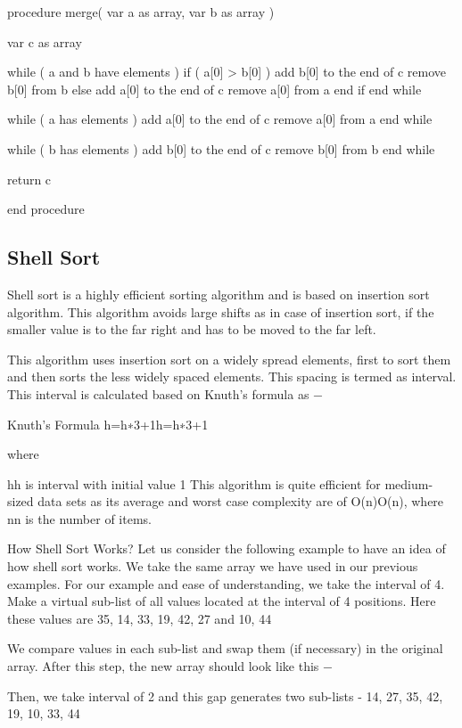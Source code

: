 procedure merge( var a as array, var b as array )

   var c as array

   while ( a and b have elements )
      if ( a[0] > b[0] )
         add b[0] to the end of c
         remove b[0] from b
      else
         add a[0] to the end of c
         remove a[0] from a
      end if
   end while

   while ( a has elements )
      add a[0] to the end of c
      remove a[0] from a
   end while

   while ( b has elements )
      add b[0] to the end of c
      remove b[0] from b
   end while

   return c

end procedure

\subsection{Shell Sort}

Shell sort is a highly efficient sorting algorithm and is based on insertion sort algorithm. This algorithm avoids large shifts as in case of insertion sort, if the smaller value is to the far right and has to be moved to the far left.

This algorithm uses insertion sort on a widely spread elements, first to sort them and then sorts the less widely spaced elements. This spacing is termed as interval. This interval is calculated based on Knuth's formula as −

Knuth's Formula
h=h∗3+1h=h∗3+1

where

hh is interval with initial value 1
This algorithm is quite efficient for medium-sized data sets as its average and worst case complexity are of O(n)Ο(n), where nn is the number of items.

How Shell Sort Works?
Let us consider the following example to have an idea of how shell sort works. We take the same array we have used in our previous examples. For our example and ease of understanding, we take the interval of 4. Make a virtual sub-list of all values located at the interval of 4 positions. Here these values are {35, 14}, {33, 19}, {42, 27} and {10, 44}



We compare values in each sub-list and swap them (if necessary) in the original array. After this step, the new array should look like this −



Then, we take interval of 2 and this gap generates two sub-lists - {14, 27, 35, 42}, {19, 10, 33, 44}



